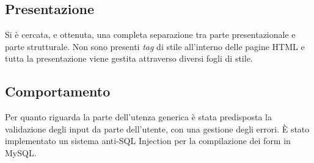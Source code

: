 \subsection{Presentazione}
Si è cercata, e ottenuta, una completa separazione tra parte presentazionale e parte strutturale. Non sono presenti \textit{tag} di stile all’interno delle pagine HTML
e tutta la presentazione viene gestita attraverso diversi fogli di stile. 
\subsection{Comportamento}

Per quanto riguarda la parte dell'utenza generica
è stata predisposta la validazione degli input da parte dell'utente, con una gestione degli errori. È stato implementato un sistema anti-SQL Injection per la compilazione dei form in MySQL.
